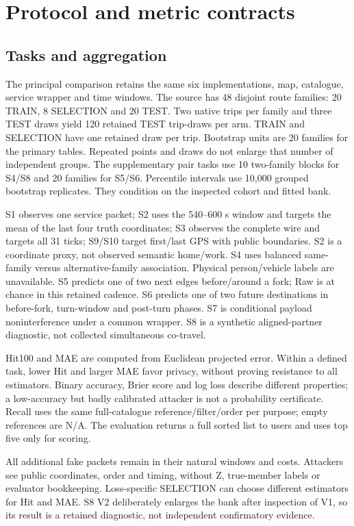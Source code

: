 \section{Protocol and metric contracts}


\subsection{Tasks and aggregation}
The principal comparison retains the same six implementations, map, catalogue,
service wrapper and time windows. The source has 48 disjoint route families:
20 TRAIN, 8 SELECTION and 20 TEST. Two native trips per family and three TEST
draws yield 120 retained TEST trip-draws per arm. TRAIN and SELECTION have one
retained draw per trip. Bootstrap units are 20 families for the primary tables.
Repeated points and draws do not enlarge that number of independent groups.
The supplementary pair tasks use 10 two-family blocks for S4/S8 and 20
families for S5/S6. Percentile intervals use 10,000 grouped bootstrap replicates.
They condition on the inspected cohort and fitted bank.

S1 observes one service packet; S2 uses the 540--600 s window and targets the
mean of the last four truth coordinates; S3 observes the complete wire and
targets all 31 ticks; S9/S10 target first/last GPS with public boundaries.
S2 is a coordinate proxy, not observed semantic home/work. S4 uses balanced
same-family versus alternative-family association. Physical person/vehicle
labels are unavailable. S5 predicts one of two next edges before/around a
fork; Raw is at chance in this retained cadence. S6 predicts one of two
future destinations in before-fork, turn-window and post-turn phases.
S7 is conditional payload noninterference under a common wrapper. S8 is a
synthetic aligned-partner diagnostic, not collected simultaneous co-travel.

Hit100 and MAE are computed from Euclidean projected error. Within a defined
task, lower Hit and larger MAE favor privacy, without proving resistance to
all estimators. Binary accuracy, Brier score and log loss describe different
properties; a low-accuracy but badly calibrated attacker is not a probability
certificate. Recall uses the same full-catalogue reference/filter/order per
purpose; empty references are N/A. The evaluation returns a full sorted list
to users and uses top five only for scoring.

All additional fake packets remain in their natural windows and costs.
Attackers see public coordinates, order and timing, without Z, true-member
labels or evaluator bookkeeping. Loss-specific SELECTION can choose different
estimators for Hit and MAE. S8 V2 deliberately enlarges the bank after
inspection of V1, so its result is a retained diagnostic, not independent
confirmatory evidence.

